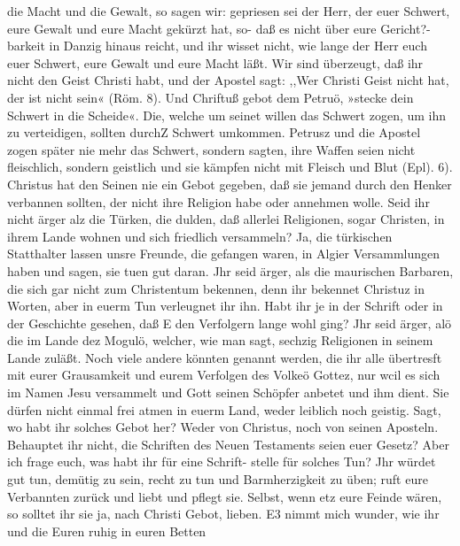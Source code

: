 die Macht und die Gewalt, so sagen wir: gepriesen sei der Herr,
der euer Schwert, eure Gewalt und eure Macht gekürzt hat, so-
daß es nicht über eure Gericht?-barkeit in Danzig hinaus reicht,
und ihr wisset nicht, wie lange der Herr euch euer Schwert, eure
Gewalt und eure Macht läßt. Wir sind überzeugt, daß ihr nicht
den Geist Christi habt, und der Apostel sagt: ,,Wer Christi Geist
nicht hat, der ist nicht sein« (Röm. 8). Und Chriftuß gebot dem
Petruö, »stecke dein Schwert in die Scheide«. Die, welche um
seinet willen das Schwert zogen, um ihn zu verteidigen, sollten
durchZ Schwert umkommen. Petrusz und die Apostel zogen später
nie mehr das Schwert, sondern sagten, ihre Waffen seien nicht
fleischlich, sondern geistlich und sie kämpfen nicht mit Fleisch und
Blut (Epl). 6). Christus hat den Seinen nie ein Gebot gegeben,
daß sie jemand durch den Henker verbannen sollten, der nicht
ihre Religion habe oder annehmen wolle. Seid ihr nicht ärger
alz die Türken, die dulden, daß allerlei Religionen, sogar Christen,
in ihrem Lande wohnen und sich friedlich versammeln? Ja, die
türkischen Statthalter lassen unsre Freunde, die gefangen waren,
in Algier Versammlungen haben und sagen, sie tuen gut daran.
Jhr seid ärger, als die maurischen Barbaren, die sich gar nicht
zum Christentum bekennen, denn ihr bekennet Christuz in Worten,
aber in euerm Tun verleugnet ihr ihn. Habt ihr je in der Schrift
oder in der Geschichte gesehen, daß E den Verfolgern lange wohl
ging? Jhr seid ärger, alö die im Lande dez Mogulö, welcher,
wie man sagt, sechzig Religionen in seinem Lande zuläßt. Noch
viele andere könnten genannt werden, die ihr alle übertresft mit
eurer Grausamkeit und eurem Verfolgen des Volkeö Gottez, nur
wcil es sich im Namen Jesu versammelt und Gott seinen Schöpfer
anbetet und ihm dient. Sie dürfen nicht einmal frei atmen in
euerm Land, weder leiblich noch geistig. Sagt, wo habt ihr
solches Gebot her? Weder von Christus, noch von seinen Aposteln.
Behauptet ihr nicht, die Schriften des Neuen Testaments seien
euer Gesetz? Aber ich frage euch, was habt ihr für eine Schrift-
stelle für solches Tun? Jhr würdet gut tun, demütig zu sein,
recht zu tun und Barmherzigkeit zu üben; ruft eure Verbannten
zurück und liebt und pflegt sie. Selbst, wenn etz eure Feinde
wären, so solltet ihr sie ja, nach Christi Gebot, lieben. E3 nimmt
mich wunder, wie ihr und die Euren ruhig in euren Betten


